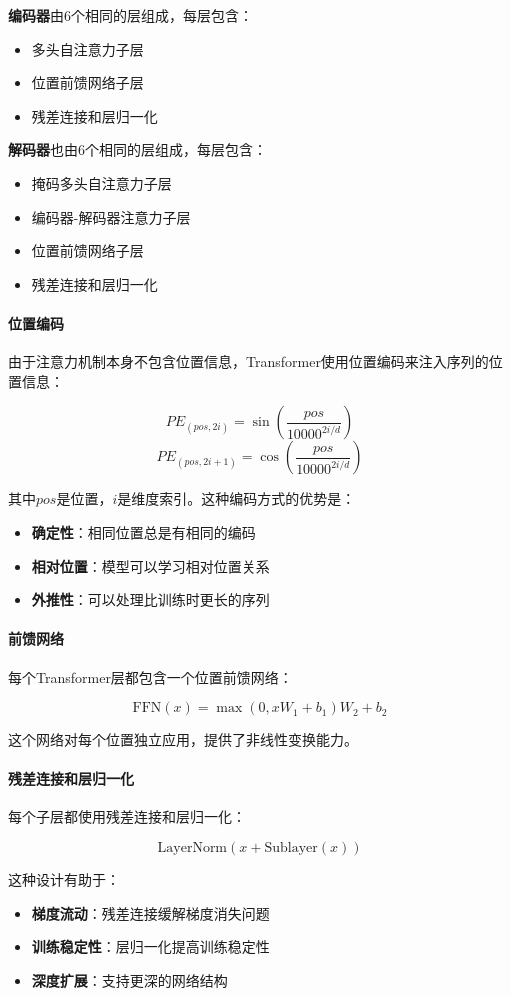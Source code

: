 \textbf{编码器}由6个相同的层组成，每层包含：
\begin{itemize}
\item 多头自注意力子层
\item 位置前馈网络子层
\item 残差连接和层归一化
\end{itemize}

\textbf{解码器}也由6个相同的层组成，每层包含：
\begin{itemize}
\item 掩码多头自注意力子层
\item 编码器-解码器注意力子层
\item 位置前馈网络子层
\item 残差连接和层归一化
\end{itemize}

\paragraph{位置编码}
由于注意力机制本身不包含位置信息，Transformer使用位置编码来注入序列的位置信息：

$$PE_{(pos, 2i)} = \sin\left(\frac{pos}{10000^{2i/d}}\right)$$
$$PE_{(pos, 2i+1)} = \cos\left(\frac{pos}{10000^{2i/d}}\right)$$

其中$pos$是位置，$i$是维度索引。这种编码方式的优势是：
\begin{itemize}
\item \textbf{确定性}：相同位置总是有相同的编码
\item \textbf{相对位置}：模型可以学习相对位置关系
\item \textbf{外推性}：可以处理比训练时更长的序列
\end{itemize}

\paragraph{前馈网络}
每个Transformer层都包含一个位置前馈网络：

$$\text{FFN}(x) = \max(0, xW_1 + b_1)W_2 + b_2$$

这个网络对每个位置独立应用，提供了非线性变换能力。

\paragraph{残差连接和层归一化}
每个子层都使用残差连接和层归一化：

$$\text{LayerNorm}(x + \text{Sublayer}(x))$$

这种设计有助于：
\begin{itemize}
\item \textbf{梯度流动}：残差连接缓解梯度消失问题
\item \textbf{训练稳定性}：层归一化提高训练稳定性
\item \textbf{深度扩展}：支持更深的网络结构
\end{itemize}

